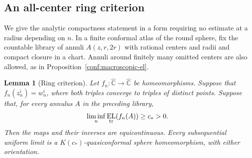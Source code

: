 \documentclass[11pt]{article}
\numberwithin{equation}{section}
\newtheorem{lemma}[theorem]{Lemma}
\theoremstyle{definition}
\theoremstyle{remark}
\newcommand{\Chat}{\widehat{\mathbb C}}
\newcommand{\1}{\mathbf 1}
\DeclareMathOperator{\EL}{EL}
\begin{document}
\subsection{An all-center ring criterion}
\label{conf:analytic-subsection}

We give the analytic compactness statement in a form requiring no
estimate at a radius depending on \(n\).  In a finite conformal
atlas of the round sphere, fix the countable library of annuli
\(A(z,r,2r)\) with rational centers and radii and compact closure
in a chart.  Annuli around finitely many omitted centers are also
allowed, as in Proposition~\ref{conf:macroscopic-el}.

\begin{lemma}[Ring criterion]
\label{conf:ring-criterion}
Let \(f_n:\Chat\to\Chat\) be homeomorphisms.  Suppose that
\(f_n(z_n^i)=w_n^i\), where both triples converge to triples of
distinct points.  Suppose that, for every annulus \(A\) in the
preceding library,
\begin{equation}
 \liminf_n\EL_{\rm tr}(f_n(A))\ge c_*>0.
 \label{conf:ring-hypothesis}
\end{equation}
Then the maps and their inverses are equicontinuous.  Every
subsequential uniform limit is a \(K(c_*)\)-quasiconformal sphere
homeomorphism, with either orientation.
\end{lemma}
\end{document}
